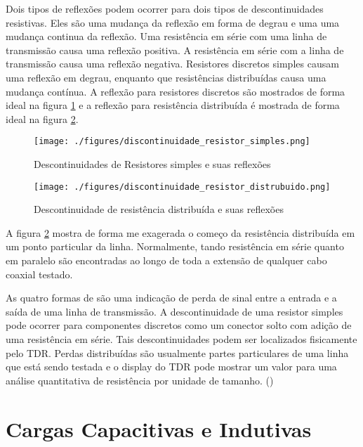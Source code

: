 Dois tipos de reflexões podem ocorrer para dois tipos de descontinuidades resistivas. Eles são uma mudança da reflexão em forma de degrau e uma uma mudança continua da reflexão. Uma resistência em série com uma linha de transmissão causa uma reflexão positiva. A resistência em série com a linha de transmissão causa uma reflexão negativa. Resistores discretos simples causam uma reflexão em degrau, enquanto que resistências distribuídas causa uma mudança contínua. A reflexão para resistores discretos são mostrados de forma ideal na figura \ref{descontinuidade_resistor_simples} e a reflexão para resistência distribuída é mostrada de forma ideal na figura \ref{descontinuidade_resistor_distribuido}.

\begin{figure}[htb!]
	\begin{center}
		\texttt{[image: ./figures/discontinuidade\_resistor\_simples.png]}
		\caption{Descontinuidades de Resistores simples e suas reflexões}
		\label{descontinuidade_resistor_simples}
	\end{center}
\end{figure}

\begin{figure}[htb!]
	\begin{center}
		\texttt{[image: ./figures/discontinuidade\_resistor\_distrubuido.png]}
		\caption{Descontinuidade de resistência distribuída e suas reflexões}
		\label{descontinuidade_resistor_distribuido}
	\end{center}
\end{figure}

A figura \ref{descontinuidade_resistor_distribuido} mostra de forma me exagerada o começo da resistência distribuída em um ponto particular da linha. Normalmente, tando resistência em série quanto em paralelo são encontradas ao longo de toda a extensão de qualquer cabo coaxial testado.

As quatro formas de são uma indicação de perda de sinal entre a entrada e a saída de uma linha de transmissão. A descontinuidade de uma resistor simples pode ocorrer para componentes discretos como um conector solto com adição de uma resistência em série. Tais descontinuidades podem ser localizados fisicamente pelo TDR. Perdas distribuídas são usualmente partes particulares de uma linha que está sendo testada e o display do TDR pode mostrar um valor para uma análise quantitativa de resistência por unidade de tamanho. (\cite{TDK})
\section{Cargas Capacitivas e Indutivas}

